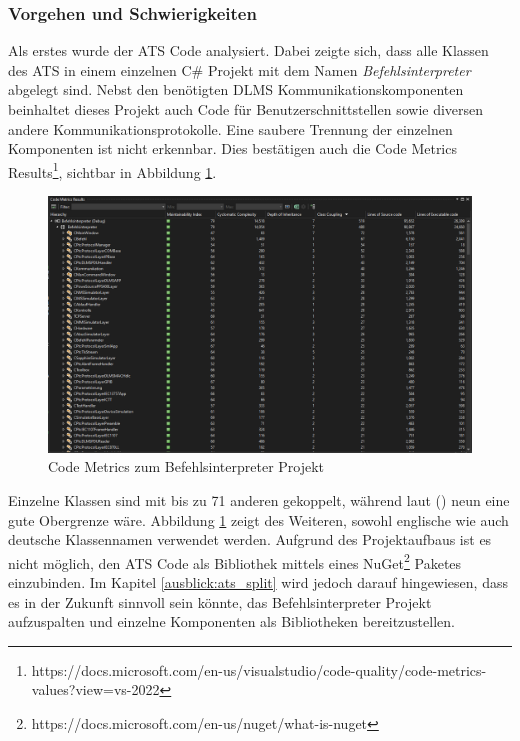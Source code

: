 \subsubsection{Vorgehen und Schwierigkeiten}\label{atsUmsetztung}
Als erstes wurde der ATS Code analysiert.
Dabei zeigte sich, dass alle Klassen des \ac{ATS} in einem einzelnen C\# Projekt mit dem Namen \textit{Befehlsinterpreter} abgelegt sind.
Nebst den benötigten \ac{DLMS} Kommunikationskomponenten beinhaltet dieses Projekt auch Code für Benutzerschnittstellen sowie diversen andere Kommunikationsprotokolle.
Eine saubere Trennung der einzelnen Komponenten ist nicht erkennbar. 
Dies bestätigen auch die Code Metrics Results\footnote{https://docs.microsoft.com/en-us/visualstudio/code-quality/code-metrics-values?view=vs-2022}, sichtbar in Abbildung \ref{fig:codemetrics}.
\begin{figure}[H]
   \centering
   \includegraphics[width=1.0\textwidth]{gfx/S1_CodeMetrics_Befehlsinterpreter.png}
   \caption{
      Code Metrics zum Befehlsinterpreter Projekt
      }
      \label{fig:codemetrics}
\end{figure}
Einzelne Klassen sind mit bis zu 71 anderen gekoppelt, während laut \citeauthor{quantitativeInvestigationRiskCodeMetrics} (\citeyear{quantitativeInvestigationRiskCodeMetrics}) neun eine gute Obergrenze wäre.
Abbildung \ref{fig:codemetrics} zeigt des Weiteren, sowohl englische wie auch deutsche Klassennamen verwendet werden.
Aufgrund des Projektaufbaus ist es nicht möglich, den \ac{ATS} Code als Bibliothek mittels eines NuGet\footnote{https://docs.microsoft.com/en-us/nuget/what-is-nuget} Paketes einzubinden.
Im Kapitel \ref{ausblick:ats_split} wird jedoch darauf hingewiesen, dass es in der Zukunft sinnvoll sein könnte,
das Befehlsinterpreter Projekt aufzuspalten und einzelne Komponenten als Bibliotheken bereitzustellen.

